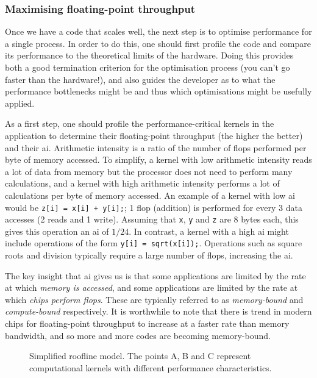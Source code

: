 \subsubsection{Maximising floating-point throughput}
\label{sec:background_perf_flops}

Once we have a code that scales well, the next step is to optimise performance for a single process.
In order to do this, one should first profile the code and compare its performance to the theoretical limits of the hardware.
Doing this provides both a good termination criterion for the optimisation process (you can't go faster than the hardware!), and also guides the developer as to what the performance bottlenecks might be and thus which optimisations might be usefully applied.

As a first step, one should profile the performance-critical kernels in the application to determine their floating-point throughput (the higher the better) and their \gls{ai}.
Arithmetic intensity is a ratio of the number of \glspl{flop} performed per byte of memory accessed.
To simplify, a kernel with low arithmetic intensity reads a lot of data from memory but the processor does not need to perform many calculations, and a kernel with high arithmetic intensity performs a lot of calculations per byte of memory accessed.
An example of a kernel with low \gls{ai} would be \texttt{z[i] = x[i] + y[i];}; 1 \gls{flop} (addition) is performed for every 3 data accesses (2 reads and 1 write).
Assuming that \texttt{x}, \texttt{y} and \texttt{z} are 8 bytes each, this gives this operation an \gls{ai} of $1/24$.
In contrast, a kernel with a high \gls{ai} might include operations of the form \texttt{y[i] = sqrt(x[i]);}.
Operations such as square roots and division typically require a large number of \glspl{flop}, increasing the \gls{ai}.

The key insight that \gls{ai} gives us is that some applications are limited by the rate at which \textit{memory is accessed}, and some applications are limited by the rate at which \textit{chips perform \glspl{flop}}.
These are typically referred to as \textit{memory-bound} and \textit{compute-bound} respectively.
It is worthwhile to note that there is trend in modern chips for floating-point throughput to increase at a faster rate than memory bandwidth, and so more and more codes are becoming memory-bound.

\begin{figure}
  
  \caption{
    Simplified roofline model.
    The points A, B and C represent computational kernels with different performance characteristics.
  }
  \label{fig:roofline}
\end{figure}

